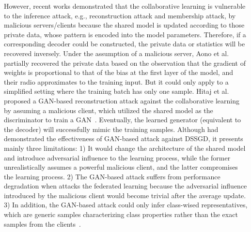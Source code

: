 \documentclass[10pt, conference, letterpaper]{IEEEtran}
\newcommand{\zz}[1]{\textcolor{red}{[Zhifei: #1]}}
\begin{document}
However, recent works demonstrated that the collaborative learning is vulnerable to the inference attack, e.g., reconstruction attack and membership attack, by malicious servers/clients because the shared model is updated according to those private data, whose pattern is encoded into the model parameters. Therefore, if a corresponding decoder could be constructed, the private data or statistics will be recovered inversely. Under the assumption of a malicious server, Aono et al.~\cite{aono2017privacy} partially recovered the private data based on the observation that the gradient of weights is proportional to that of the bias at the first layer of the model, and their radio approximates to the training input.
But it could only apply to a simplified setting where the training batch has only one sample.
Hitaj et al.~\cite{hitaj2017deep} proposed a GAN-based reconstruction attack against the collaborative learning by assuming a malicious client, which utilized the shared model as the discriminator to train a GAN~\cite{goodfellow2014generative}. Eventually, the learned generator (equivalent to the decoder) will successfully mimic the training samples.
Although \cite{hitaj2017deep} had demonstrated the effectiveness of GAN-based attack against DSSGD,
it presents mainly three limitations: 1) It would change the architecture of the shared model and introduce adversarial influence to the learning process, while the former unrealistically assumes a powerful malicious client, and the latter compromises the learning process. 2) The GAN-based attack suffers from performance degradation when attacks the federated learning because the adversarial influence introduced by the malicious client would become trivial after the average update. 3) In addition, the GAN-based attack could only infer class-wised representatives, which are generic samples characterizing class properties rather than the exact samples from the clients~\cite{melis2018inference}.
\end{document}
